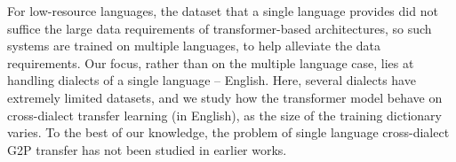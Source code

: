 For low-resource languages, the dataset that a single language provides did not suffice the large data requirements of transformer-based architectures, so such systems are trained on multiple languages, to help alleviate the data requirements. Our focus, rather than on the multiple language case, lies at handling dialects of a single language -- English. Here, several dialects have extremely limited datasets, and we study how the transformer model behave on cross-dialect transfer learning (in English), as the size of the training dictionary varies. To the best of our knowledge, the problem of single language cross-dialect G2P transfer has not been studied in earlier works.
% 
% 
% 
% 
% 
% 